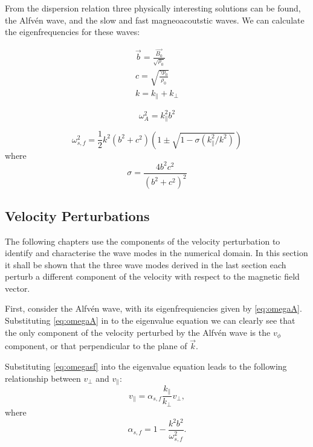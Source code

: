 \pagebreak

From the dispersion relation three physically interesting solutions can be found, the Alfv\'en wave, and the slow and fast magneoacoutstic waves.
We can calculate the eigenfrequencies for these waves:

\begin{align}
    \vec{b} = \frac{\vec{B_0}}{\sqrt{\rho_0}}\label{eq:b}\\
    c = \sqrt{\frac{\gamma p_0}{\rho_0}}\label{eq:c}\\
    k = k_\parallel + k_\perp
\end{align}

\begin{equation}
\omega^2_A = k^2_\parallel b^2
\label{eq:omegaA}
\end{equation}

\begin{equation}
    \omega^2_{s,f} = \frac{1}{2}k^2(b^2+c^2)\left(1 \pm \sqrt{1 - \sigma (k^2_\parallel/k^2)}\right)
    \label{eq:omegasf}
\end{equation}
where
\begin{equation}
    \sigma=\frac{4b^2c^2}{(b^2 + c^2)^2}
    \label{eq:sigmasf}
\end{equation}



\subsection{Velocity Perturbations}\label{sec:Vpert}

The following chapters use the components of the velocity perturbation to identify and characterise the wave modes in the numerical domain.
In this section it shall be shown that the three wave modes derived in the last section each perturb a different component of the velocity with respect to the magnetic field vector.

First, consider the Alfv\'en wave, with its eigenfrequiencies given by \cref{eq:omegaA}.
Substituting \cref{eq:omegaA} in to the eigenvalue equation %
we can clearly see that the only component of the velocity perturbed by the Alfv\'en wave is the $v_\phi$ component, or that perpendicular to the plane of $\vec{k}$.

Substituting \cref{eq:omegasf} into the eigenvalue equation leads to the following relationship between $v_\perp$ and $v_\parallel$:
\begin{equation}
    v_\parallel = \alpha_{s,f} \frac{k_\parallel}{k_\perp}v_\perp,
    \label{eq:vyvz}
\end{equation}
where
\begin{equation}
    \alpha_{s,f} = 1 - \frac{k^2b^2}{\omega^2_{s,f}}.
    \label{eq:alphasf}
\end{equation}

